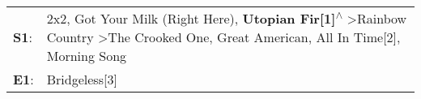\begin{supertabular}{p{0.03\textwidth}p{0.92\textwidth}}
 \textbf{S1}:  &  2x2\textsuperscript{}, \enspace Got Your Milk (Right Here)\textsuperscript{}, \enspace \textbf{Utopian Fir[1]\textsuperscript{$\wedge$}} \textgreater \enspace Rainbow Country\textsuperscript{} \textgreater \enspace The Crooked One\textsuperscript{}, \enspace Great American\textsuperscript{}, \enspace All In Time[2]\textsuperscript{}, \enspace Morning Song\textsuperscript{}  \enspace  \\
 \textbf{E1}:  &                                                                                                                                                                                                                                                                                                                                                          Bridgeless[3]\textsuperscript{}  \enspace  \\
\end{supertabular}
